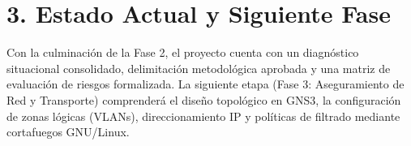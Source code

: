 \documentclass[11pt,letterpaper]{article}
\begin{document}
\vspace{0.3cm}

\section*{\color{unabblue}3. Estado Actual y Siguiente Fase}
Con la culminación de la Fase 2, el proyecto cuenta con un diagnóstico situacional consolidado, delimitación metodológica aprobada y una matriz de evaluación de riesgos formalizada. La siguiente etapa (Fase 3: Aseguramiento de Red y Transporte) comprenderá el diseño topológico en GNS3, la configuración de zonas lógicas (VLANs), direccionamiento IP y políticas de filtrado mediante cortafuegos GNU/Linux.
\end{document}
